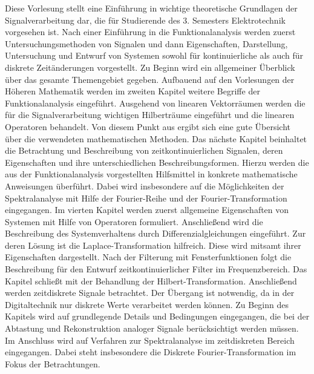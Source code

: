 \begin{course}
\begin{learningoutcomes}
\end{learningoutcomes}

\begin{content}
Diese Vorlesung stellt eine Einführung in wichtige theoretische Grundlagen der Signalverarbeitung dar, die für Studierende des 3. Semesters Elektrotechnik vorgesehen ist. Nach einer Einführung in die Funktionalanalysis werden zuerst Untersuchungsmethoden von Signalen und dann Eigenschaften, Darstellung, Untersuchung und Entwurf von Systemen sowohl für kontinuierliche als auch für diskrete Zeitänderungen vorgestellt.\newline
Zu Beginn wird ein allgemeiner Überblick über das gesamte Themengebiet gegeben.\newline
Aufbauend auf den Vorlesungen der Höheren Mathematik werden im zweiten Kapitel weitere Begriffe der Funktionalanalysis eingeführt. Ausgehend von linearen Vektorräumen werden die für die Signalverarbeitung wichtigen Hilberträume eingeführt und die linearen Operatoren behandelt. Von diesem Punkt aus ergibt sich eine gute Übersicht über die verwendeten mathematischen Methoden. \newline
Das nächste Kapitel beinhaltet die Betrachtung und Beschreibung von zeitkontinuierlichen Signalen, deren Eigenschaften und ihre unterschiedlichen Beschreibungsformen. Hierzu werden die aus der Funktionalanalysis vorgestellten Hilfsmittel in konkrete mathematische Anweisungen überführt. Dabei wird insbesondere auf die Möglichkeiten der Spektralanalyse mit Hilfe der Fourier-Reihe und der Fourier-Transformation eingegangen.\newline
Im vierten Kapitel werden zuerst allgemeine Eigenschaften von Systemen mit Hilfe von Operatoren formuliert. Anschließend wird die Beschreibung des Systemverhaltens durch Differenzialgleichungen eingeführt. Zur deren Lösung ist die Laplace-Transformation hilfreich. Diese wird mitsamt ihrer Eigenschaften dargestellt. Nach der Filterung mit Fensterfunktionen folgt die Beschreibung für den Entwurf zeitkontinuierlicher Filter im Frequenzbereich. Das Kapitel schließt mit der Behandlung der Hilbert-Transformation.\newline
Anschließend werden zeitdiskrete Signale betrachtet. Der Übergang ist notwendig, da in der Digitaltechnik nur diskrete Werte verarbeitet werden können. Zu Beginn des Kapitels wird auf grundlegende Details und Bedingungen eingegangen, die bei der Abtastung und Rekonstruktion analoger Signale berücksichtigt werden müssen. Im Anschluss wird auf Verfahren zur Spektralanalyse im zeitdiskreten Bereich eingegangen. Dabei steht insbesondere die Diskrete Fourier-Transformation im Fokus der Betrachtungen.\newline

\end{content}
\end{course}
